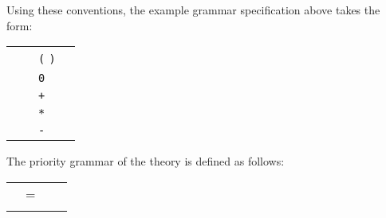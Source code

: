 \begin{isabellebody}
\begin{isamarkuptext}
  Using these conventions, the example grammar specification above
  takes the form:
  \begin{center}
  \begin{tabular}{rclc}
    \isa{A} & \isa{{\isachardoublequote}{\isacharequal}{\isachardoublequote}} & \verb|(| \isa{A} \verb|)| \\
              & \isa{{\isachardoublequote}{\isacharbar}{\isachardoublequote}} & \verb|0| & \qquad\qquad \\
              & \isa{{\isachardoublequote}{\isacharbar}{\isachardoublequote}} & \isa{A} \verb|+| \isa{{\isachardoublequote}A\isactrlsup {\isacharparenleft}\isactrlsup {\isadigit{1}}\isactrlsup {\isacharparenright}{\isachardoublequote}} & \isa{{\isachardoublequote}{\isacharparenleft}{\isadigit{0}}{\isacharparenright}{\isachardoublequote}} \\
              & \isa{{\isachardoublequote}{\isacharbar}{\isachardoublequote}} & \isa{{\isachardoublequote}A\isactrlsup {\isacharparenleft}\isactrlsup {\isadigit{3}}\isactrlsup {\isacharparenright}{\isachardoublequote}} \verb|*| \isa{{\isachardoublequote}A\isactrlsup {\isacharparenleft}\isactrlsup {\isadigit{2}}\isactrlsup {\isacharparenright}{\isachardoublequote}} & \isa{{\isachardoublequote}{\isacharparenleft}{\isadigit{2}}{\isacharparenright}{\isachardoublequote}} \\
              & \isa{{\isachardoublequote}{\isacharbar}{\isachardoublequote}} & \verb|-| \isa{{\isachardoublequote}A\isactrlsup {\isacharparenleft}\isactrlsup {\isadigit{3}}\isactrlsup {\isacharparenright}{\isachardoublequote}} & \isa{{\isachardoublequote}{\isacharparenleft}{\isadigit{3}}{\isacharparenright}{\isachardoublequote}} \\
  \end{tabular}
  \end{center}%
\end{isamarkuptext}%
\isamarkuptrue%
%
\isamarkuptrue%
%
\begin{isamarkuptext}%
The priority grammar of the  theory is defined as follows:


  \begin{center}
  \begin{supertabular}{rclr}

  \hypertarget{syntax.inner.any}{\hyperlink{syntax.inner.any}{\mbox{}}} & = &  \\\\


\end{supertabular}
\end{center}
\end{isamarkuptext}
\end{isabellebody}

